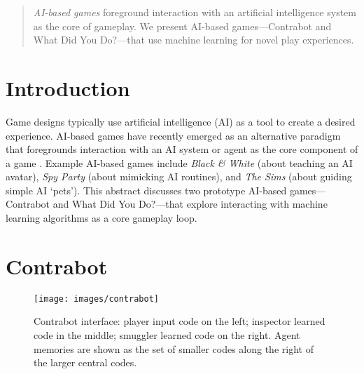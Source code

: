\documentclass{sig-alternate}
\begin{document}
\toappear{}

\maketitle
\begin{abstract}
{\it AI-based games} foreground interaction with an artificial intelligence system as the core of gameplay.
We present AI-based games---{\sc Contrabot} and {\sc What Did You Do?}---that use machine learning for novel play experiences.
\end{abstract}

%
%


\section{Introduction}

\noindent Game designs typically use artificial intelligence (AI) as a tool to create a desired experience.
AI-based games have recently emerged as an alternative paradigm that foregrounds interaction with an AI system or agent as the core component of a game \cite{eladhari2011:ai-based-games, treanor2015:ai-based-games}.
Example AI-based games include {\it Black \& White} (about teaching an AI avatar), {\it Spy Party} (about mimicking AI routines), and {\it The Sims} (about guiding simple AI `pets').
This abstract discusses two prototype AI-based games---{\sc Contrabot} and {\sc What Did You Do?}---that explore interacting with machine learning algorithms as a core gameplay loop.

\section{Contrabot}

\begin{figure}[tb]
\centering
\texttt{[image: images/contrabot]}
\caption{{\sc Contrabot} interface: player input code on the left; inspector learned code in the middle; smuggler learned code on the right. 
Agent memories are shown as the set of smaller codes along the right of the larger central codes.}
\label{fig:contrabot}
\end{figure}
\end{document}
